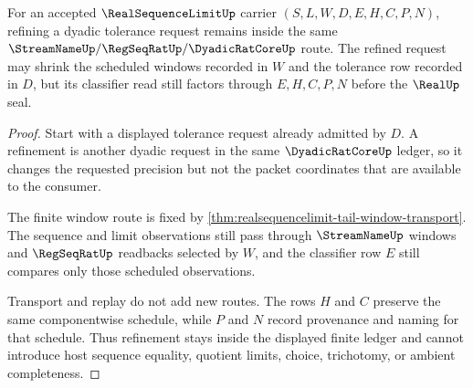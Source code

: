 \begin{theorem}\label{thm:real-sequence-limit-tail-refinement-ledger}
For an accepted $\RealSequenceLimitUp$ carrier $(S,L,W,D,E,H,C,P,N)$, refining a dyadic tolerance request remains inside the same $\StreamNameUp/\RegSeqRatUp/\DyadicRatCoreUp$ route. The refined request may shrink the scheduled windows recorded in $W$ and the tolerance row recorded in $D$, but its classifier read still factors through $E,H,C,P,N$ before the $\RealUp$ seal.
\end{theorem}
\begin{proof}
Start with a displayed tolerance request already admitted by $D$. A refinement is another dyadic request in the same $\DyadicRatCoreUp$ ledger, so it changes the requested precision but not the packet coordinates that are available to the consumer.

The finite window route is fixed by \autoref{thm:realsequencelimit-tail-window-transport}. The sequence and limit observations still pass through $\StreamNameUp$ windows and $\RegSeqRatUp$ readbacks selected by $W$, and the classifier row $E$ still compares only those scheduled observations.

Transport and replay do not add new routes. The rows $H$ and $C$ preserve the same componentwise schedule, while $P$ and $N$ record provenance and naming for that schedule. Thus refinement stays inside the displayed finite ledger and cannot introduce host sequence equality, quotient limits, choice, trichotomy, or ambient completeness.
\end{proof}

